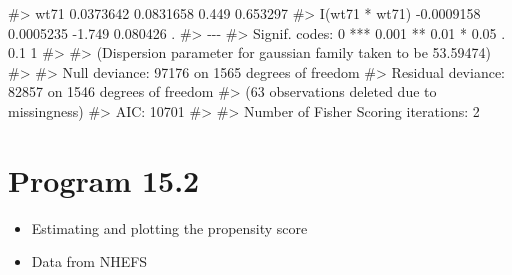 \documentclass[
  10pt,
  a4paper,
]{book}
\newenvironment{Shaded}{\begin{snugshade}}{\end{snugshade}}
\newcommand{\CommentTok}[1]{\textcolor[rgb]{0.37,0.37,0.37}{#1}}
\providecommand{\tightlist}{%
  \setlength{\itemsep}{0pt}\setlength{\parskip}{0pt}}
\begin{document}
\begin{Shaded}
\begin{Highlighting}[]
\CommentTok{\#\textgreater{} wt71                                0.0373642  0.0831658   0.449 0.653297    }
\CommentTok{\#\textgreater{} I(wt71 * wt71)                     {-}0.0009158  0.0005235  {-}1.749 0.080426 .  }
\CommentTok{\#\textgreater{} {-}{-}{-}}
\CommentTok{\#\textgreater{} Signif. codes:  0 \textquotesingle{}***\textquotesingle{} 0.001 \textquotesingle{}**\textquotesingle{} 0.01 \textquotesingle{}*\textquotesingle{} 0.05 \textquotesingle{}.\textquotesingle{} 0.1 \textquotesingle{} \textquotesingle{} 1}
\CommentTok{\#\textgreater{} }
\CommentTok{\#\textgreater{} (Dispersion parameter for gaussian family taken to be 53.59474)}
\CommentTok{\#\textgreater{} }
\CommentTok{\#\textgreater{}     Null deviance: 97176  on 1565  degrees of freedom}
\CommentTok{\#\textgreater{} Residual deviance: 82857  on 1546  degrees of freedom}
\CommentTok{\#\textgreater{}   (63 observations deleted due to missingness)}
\CommentTok{\#\textgreater{} AIC: 10701}
\CommentTok{\#\textgreater{} }
\CommentTok{\#\textgreater{} Number of Fisher Scoring iterations: 2}
\end{Highlighting}
\end{Shaded}

\section{Program 15.2}\label{program-15.2}

\begin{itemize}
\tightlist
\item
  Estimating and plotting the propensity score
\item
  Data from NHEFS
\end{itemize}
\end{document}
